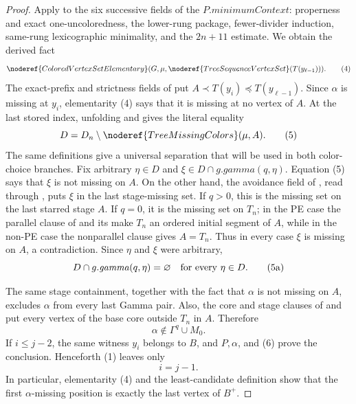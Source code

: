 \begin{proof}
Apply  to the six
successive fields of the
\(P.\mathit{minimumContext}\): properness and exact one-uncoloredness,
the lower-rung package, fewer-divider induction, same-rung lexicographic
minimality, and the \(2n+11\) estimate.  We obtain the derived fact
\[
 \noderef{ColoredVertexSetElementary}
   (G,\mu,\noderef{TreeSequenceVertexSet}(T(y_{\ell-1}))).    \tag{4}
\]
The exact-prefix and strictness fields of
 put \(A\prec T(y_i)\preccurlyeq
T(y_{\ell-1})\).  Since \(\alpha\) is missing at \(y_i\), elementarity
(4) says that it is missing at no vertex of \(A\).  At the last stored
index, unfolding  and
 gives the literal equality
\[
 D=D_n\setminus\noderef{TreeMissingColors}(\mu,A).            \tag{5}
\]
The same definitions give a universal separation that will be used in
both color-choice branches.  Fix arbitrary \(\eta\in D\) and
\(\xi\in D\cap g.\mathit{gamma}(q,\eta)\).  Equation (5) says that
\(\xi\) is not missing on \(A\).  On the other hand, the avoidance field
of , read through
, puts \(\xi\) in the last
stage-missing set.  If \(q>0\), this is the missing set on the last
starred stage \(A\).  If \(q=0\), it is the missing set on \(T_n\); in
the PE case the parallel clause of  and its
 make \(T_n\) an ordered initial segment of
\(A\), while in the non-PE case the nonparallel clause gives \(A=T_n\).
Thus in every case \(\xi\) is missing on \(A\), a contradiction.  Since
\(\eta\) and \(\xi\) were arbitrary,
\[
 D\cap g.\mathit{gamma}(q,\eta)=\varnothing
                         \quad\hbox{for every }\eta\in D.     \tag{5a}
\]

The same stage containment, together with the fact that \(\alpha\) is
not missing on \(A\), excludes \(\alpha\) from every last Gamma pair.
Also, the core and stage clauses of  and
 put every vertex of the base core outside
\(T_n\) in \(A\).  Therefore
\[
                    \alpha\notin\Gamma^q\cup M_0.            \tag{6}
\]
If \(i\leq j-2\), the same witness \(y_i\) belongs to \(B\), and
\(P,\alpha\), and (6) prove the conclusion.  Henceforth (1) leaves only
\[
                              i=j-1.                          \tag{7}
\]
In particular, elementarity (4) and the least-candidate definition
 show that the first
\(\alpha\)-missing position is exactly the last vertex of \(B^+\).


\end{proof}
